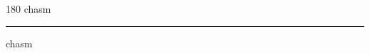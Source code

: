 
\begin{frame}
\begin{center}
\begin{turn}{180}
{\fontsize{2.5cm}{1em}\selectfont chasm}
\end{turn}
\vspace{1em}\par  
\hrule
\vspace{1em}\par  
{\fontsize{2.5cm}{1em}\selectfont chasm}
\end{center}
\end{frame}
